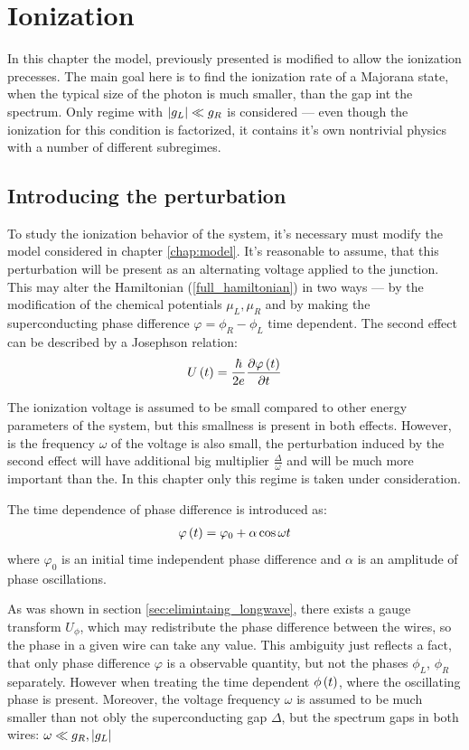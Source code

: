 \chapter{Ionization}
\label{chap:ionization}

In this chapter the model, previously presented is modified to allow the ionization precesses. The main goal here is to find the ionization rate of a Majorana state, when the typical size of the photon is much smaller, than the gap int the spectrum.  Only regime with $ \left|g_L\right|\ll g_R $ is considered --- even though the ionization for this condition is factorized, it contains it's own nontrivial physics with a number of different subregimes.

\section{Introducing the perturbation}

To study the ionization behavior of the system, it's necessary must modify the model considered in chapter \ref{chap:model}. It's reasonable to assume, that this perturbation will be present as an alternating voltage applied to the junction. This may alter the Hamiltonian (\ref{full_hamiltonian}) in two ways --- by the modification of the chemical potentials $ \mu_L, \mu_R $ and by making the superconducting phase difference $ \varphi=\phi_R-\phi_L $ time dependent. The second effect can be described by a Josephson relation:
\begin{gather}
	U\left(t\right)
	=
	\frac{\hbar}{2e}
	\frac{\partial\varphi\left(t\right)}{\partial t}
\end{gather}

The ionization voltage is assumed to be small compared to other energy parameters of the system, but this smallness is present in both effects. However, is the frequency $ \omega $ of the voltage is also small, the perturbation induced by the second effect will have additional big multiplier $ \frac{\Delta}{\omega} $ and will be much more important than the. In this chapter only this regime is taken under consideration.

The time dependence of phase difference is introduced as:
\begin{gather}
	\varphi\left(t\right)=\varphi_0+\alpha\cos\omega t
\end{gather}
where $ \varphi_0 $ is an initial time independent phase difference and $ \alpha $ is an amplitude of phase oscillations.

As was shown in section \ref{sec:elimintaing_longwave}, there exists a gauge transform $ U_\phi $, which may redistribute the phase difference between the wires, so the phase in a given wire can take any value. This ambiguity just reflects a  fact, that only phase difference $ \varphi $ is a observable quantity, but not the phases $ \phi_L $, $ \phi_R $ separately. However when treating the time dependent $ \phi\left(t\right) $, where the oscillating phase is present. Moreover, the voltage frequency $ \omega $ is assumed to be much smaller than not obly the superconducting gap $ \Delta $, but the spectrum gaps in both wires: $ \omega\ll g_R, \left|g_L\right| $


